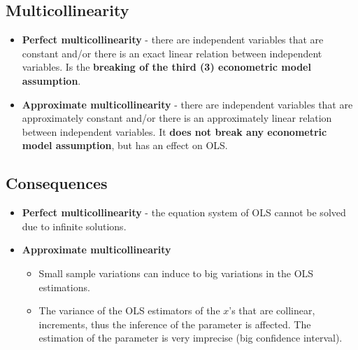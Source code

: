 \documentclass[10pt, a4paper, landscape]{extarticle}
\begin{document}
\begin{multicols}{3}
\section*{Multicollinearity}
	\begin{itemize}[leftmargin=*]
		\item \textbf{Perfect multicollinearity} - there are independent variables that are constant and/or there is an exact linear relation between independent variables. Is the \textbf{breaking of the third (3) econometric model assumption}.
		\item \textbf{Approximate multicollinearity} - there are independent variables that are approximately constant and/or there is an approximately linear relation between independent variables. It \textbf{does not break any econometric model assumption}, but has an effect on OLS.
	\end{itemize}
	\subsection*{Consequences}
		\begin{itemize}[leftmargin=*]
			\item \textbf{Perfect multicollinearity} - the equation system of OLS cannot be solved due to infinite solutions.
			\item \textbf{Approximate multicollinearity}
			\begin{itemize}[leftmargin=*]
				\item Small sample variations can induce to big variations in the OLS estimations.
				\item The variance of the OLS estimators of the $x$'s that are collinear, increments, thus the inference of the parameter is affected. The estimation of the parameter is very imprecise (big confidence interval).
			\end{itemize}
		\end{itemize}

\end{multicols}
\end{document}

